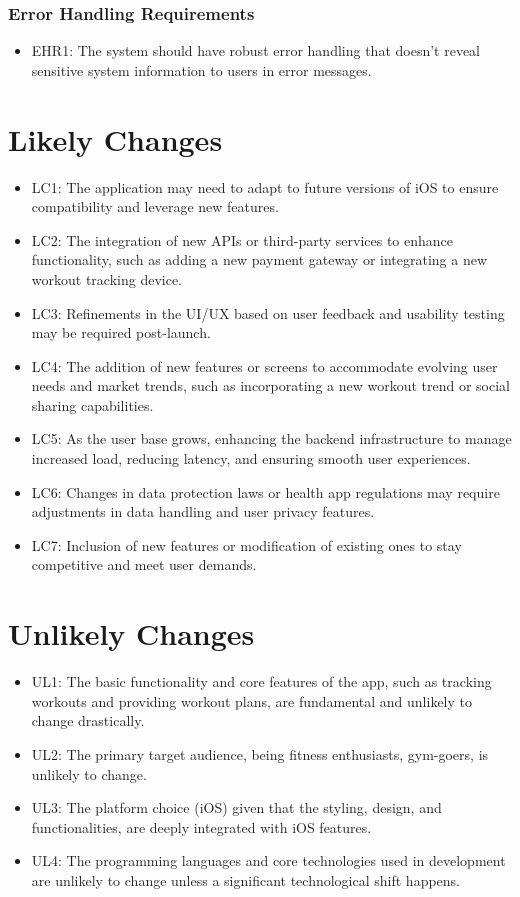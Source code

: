 \documentclass[12pt]{article}
\begin{document}
\subsubsection{Error Handling Requirements}
\begin{itemize}
    \item EHR1: The system should have robust error handling that doesn't reveal sensitive system information to users in error messages.
\end{itemize}

\section{Likely Changes}
\begin{itemize}
    \item LC1: The application may need to adapt to future versions of iOS to ensure compatibility and leverage new features.
    \item LC2: The integration of new APIs or third-party services to enhance functionality, such as adding a new payment gateway or integrating a new workout tracking device.
    \item LC3: Refinements in the UI/UX based on user feedback and usability testing may be required post-launch.
    \item LC4: The addition of new features or screens to accommodate evolving user needs and market trends, such as incorporating a new workout trend or social sharing capabilities.
    \item LC5: As the user base grows, enhancing the backend infrastructure to manage increased load, reducing latency, and ensuring smooth user experiences.
    \item LC6: Changes in data protection laws or health app regulations may require adjustments in data handling and user privacy features.
    \item LC7: Inclusion of new features or modification of existing ones to stay competitive and meet user demands.
\end{itemize}

\section{Unlikely Changes}
\begin{itemize}
    \item UL1: The basic functionality and core features of the app, such as tracking workouts and providing workout plans, are fundamental and unlikely to change drastically.
    \item UL2: The primary target audience, being fitness enthusiasts, gym-goers, is unlikely to change.
    \item UL3: The platform choice (iOS) given that the styling, design, and functionalities, are deeply integrated with iOS features.
    \item UL4: The programming languages and core technologies used in development are unlikely to change unless a significant technological shift happens.
\end{itemize}
\end{document}
